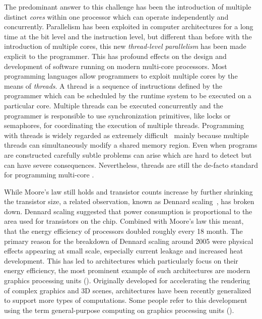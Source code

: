 The predominant answer to this challenge has been the introduction of multiple distinct \emph{cores} within one processor which can operate independently and concurrently.
Parallelism has been exploited in computer architectures for a long time at the bit level and the instruction level, but different than before with the introduction of multiple cores, this new \emph{thread-level parallelism} has been made explicit to the programmer.
This has profound effects on the design and development of software running on modern multi-core processors.
Most programming languages allow programmers to exploit multiple cores by the means of \emph{threads}.
A thread is a sequence of instructions defined by the programmer which can be scheduled by the runtime system to be executed on a particular core.
Multiple threads can be executed concurrently and the programmer is responsible to use synchronization primitives, like locks or semaphores, for coordinating the execution of multiple threads.
Programming with threads is widely regarded as extremely difficult~\cite{Lee06} mainly because multiple threads can simultaneously modify a shared memory region.
Even when programs are constructed carefully subtle problems can arise which are hard to detect but can have severe consequences.
Nevertheless, threads are still the de-facto standard for programming multi-core \CPUs.

\bigskip

\noindent
While Moore's law still holds and transistor counts increase by further shrinking the transistor size, a related observation, known as Dennard scaling~\cite{DennardRiBaLe1974}, has broken down.
Dennard scaling suggested that power consumption is proportional to the area used for transistors on the chip.
Combined with Moore's law this meant, that the energy efficiency of processors doubled roughly every 18 month.
The primary reason for the breakdown of Dennard scaling around 2005 were physical effects appearing at small scale, especially current leakage and increased heat development.
This has led to architectures which particularly focus on their energy efficiency, the most prominent example of such architectures are modern graphics processing units (\GPUs).
Originally developed for accelerating the rendering of complex graphics and 3D scenes, \GPU architectures have been recently generalized to support more types of computations.
Some people refer to this development using the term general-purpose computing on graphics processing units (\GPGPU).

